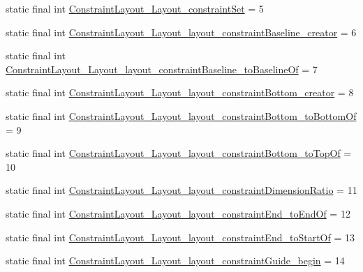 \begin{DoxyCompactItemize}
\item 
static final int \mbox{\hyperlink{classandroid_1_1support_1_1constraint_1_1R_1_1styleable_a3500019b043e160275860cdfa99d9e4c}{Constraint\+Layout\+\_\+\+Layout\+\_\+constraint\+Set}} = 5
\item 
static final int \mbox{\hyperlink{classandroid_1_1support_1_1constraint_1_1R_1_1styleable_a0f9cb84fb067647da83848d1be8627cd}{Constraint\+Layout\+\_\+\+Layout\+\_\+layout\+\_\+constraint\+Baseline\+\_\+creator}} = 6
\item 
static final int \mbox{\hyperlink{classandroid_1_1support_1_1constraint_1_1R_1_1styleable_a8435fc36cbd1e5f2aa353249accc481a}{Constraint\+Layout\+\_\+\+Layout\+\_\+layout\+\_\+constraint\+Baseline\+\_\+to\+Baseline\+Of}} = 7
\item 
static final int \mbox{\hyperlink{classandroid_1_1support_1_1constraint_1_1R_1_1styleable_ab3dd331e48f78d1f3c04def8106d353e}{Constraint\+Layout\+\_\+\+Layout\+\_\+layout\+\_\+constraint\+Bottom\+\_\+creator}} = 8
\item 
static final int \mbox{\hyperlink{classandroid_1_1support_1_1constraint_1_1R_1_1styleable_a1008cefb94a6dbb214df4a61fba4c37e}{Constraint\+Layout\+\_\+\+Layout\+\_\+layout\+\_\+constraint\+Bottom\+\_\+to\+Bottom\+Of}} = 9
\item 
static final int \mbox{\hyperlink{classandroid_1_1support_1_1constraint_1_1R_1_1styleable_a0984ad235d497a29196d0e910309450a}{Constraint\+Layout\+\_\+\+Layout\+\_\+layout\+\_\+constraint\+Bottom\+\_\+to\+Top\+Of}} = 10
\item 
static final int \mbox{\hyperlink{classandroid_1_1support_1_1constraint_1_1R_1_1styleable_a434e491e33ab7e798a7ff01ec3f478d1}{Constraint\+Layout\+\_\+\+Layout\+\_\+layout\+\_\+constraint\+Dimension\+Ratio}} = 11
\item 
static final int \mbox{\hyperlink{classandroid_1_1support_1_1constraint_1_1R_1_1styleable_ab29c135647b193122a4223b973c2f2a8}{Constraint\+Layout\+\_\+\+Layout\+\_\+layout\+\_\+constraint\+End\+\_\+to\+End\+Of}} = 12
\item 
static final int \mbox{\hyperlink{classandroid_1_1support_1_1constraint_1_1R_1_1styleable_a206aa416984b55033def86a8af9293b0}{Constraint\+Layout\+\_\+\+Layout\+\_\+layout\+\_\+constraint\+End\+\_\+to\+Start\+Of}} = 13
\item 
static final int \mbox{\hyperlink{classandroid_1_1support_1_1constraint_1_1R_1_1styleable_a5db2133f0b11d116ffcf7ea98162fbb4}{Constraint\+Layout\+\_\+\+Layout\+\_\+layout\+\_\+constraint\+Guide\+\_\+begin}} = 14
\item 

\end{DoxyCompactItemize}
